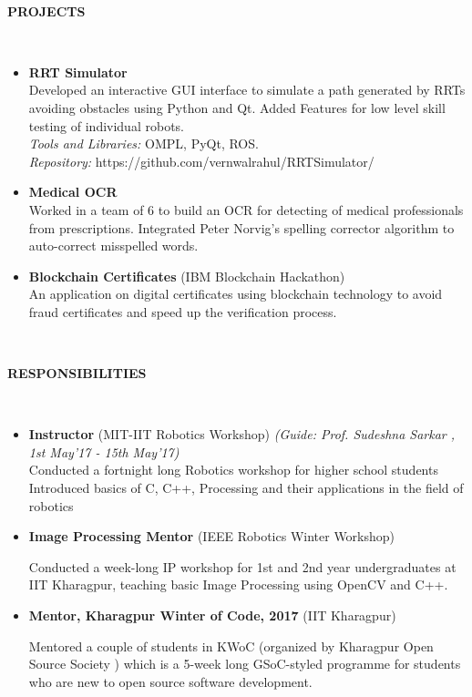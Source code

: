 \documentclass[a4paper,8pt]{article}
\newcommand{\lsep}{-0.5cm}
\newcommand{\resheading}[1]{{\small \colorbox{mygrey}{\begin{minipage}{0.975\textwidth}{\textbf{#1 \vphantom{p\^{E}}}}\end{minipage}}}}
\begin{document}
\hspace{0.5cm}\\[-0.2cm]
\resheading{\textbf{PROJECTS} }\\[\lsep]
\begin{itemize}

\item \textbf{RRT Simulator} \\
\small{Developed an interactive GUI interface to simulate a path generated by RRTs avoiding obstacles using Python and Qt. Added Features for low level skill testing of individual robots.}\\
\textit{Tools and Libraries:} \small{OMPL, PyQt, ROS.}\\
\textit{Repository:} \small{{https://github.com/vernwalrahul/RRTSimulator/}} 

\item \textbf{Medical OCR} \hspace{0.5cm} \\
\small{Worked in a team of 6 to build an OCR for detecting of medical professionals from prescriptions. Integrated Peter Norvig's spelling corrector algorithm to auto-correct misspelled words.} 
	
\item \textbf{Blockchain Certificates} (IBM Blockchain Hackathon) \\
\small{An application on digital certificates using blockchain technology to avoid fraud certificates and speed up the verification process.} 
\end{itemize}


\hspace{0.5cm}\\[-0.2cm]
\resheading{\textbf{ RESPONSIBILITIES } }\\[\lsep]
\begin{itemize}
\item \textbf{Instructor} (MIT-IIT Robotics Workshop) \hfill \textit{(Guide: Prof. Sudeshna Sarkar
, 1st May'17 - 15th May'17)} \\
\small{Conducted a fortnight long Robotics workshop for higher school students
Introduced basics of C, C++, Processing and their applications in the field of robotics} 

\item \textbf{Image Processing Mentor} (IEEE Robotics Winter Workshop) \hspace{0.5cm}\

\small{Conducted a week-long IP workshop for 1st and 2nd year undergraduates at IIT Kharagpur, teaching basic Image Processing using OpenCV and C++.} 

\item \textbf{Mentor, Kharagpur Winter of Code, 2017} (IIT Kharagpur) \hspace{0.5cm}\

\small{Mentored a couple of students in KWoC (organized by Kharagpur Open Source Society
) which is a 5-week long GSoC-styled programme for students who are new to open source software development. } 

\end{itemize}
\end{document}
